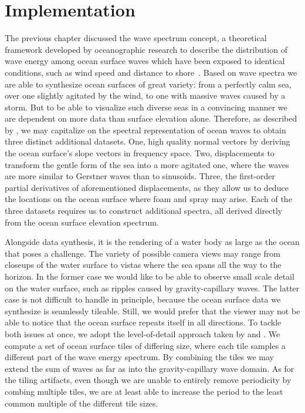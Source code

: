 \chapter{Implementation}
\label{ch:implementation}
%
The previous chapter discussed the wave spectrum concept, a theoretical
framework developed by oceanographic research to describe the distribution of
wave energy among ocean surface waves which have been exposed to identical
conditions, such as wind speed and distance to shore~\citep{Neumann:1966}.
Based on wave spectra we are able to synthesize ocean surfaces of great variety:
from a perfectly calm sea, over one slightly agitated by the wind, to one with
massive waves caused by a storm. %
But to be able to visualize such diverse seas in a convincing manner we are dependent on more data
than surface elevation alone. Therefore, as described by \citet{course:simulatingocean},
we may capitalize on the spectral representation of ocean waves to obtain
three distinct additional datasets.
One, high quality normal vectors by deriving the ocean surface's slope vectors in frequency space.
Two, displacements to transform the gentle form of the sea into a more agitated one, where the waves are more similar to Gerstner waves than to sinusoids.
Three, the first-order partial derivatives of aforementioned displacements, as they allow us to deduce the locations on the ocean surface where
foam and spray may arise.
Each of the three datasets requires us to construct additional spectra,
all derived directly from the ocean surface elevation spectrum.

Alongside data synthesis, it is the rendering of a water body as large as the ocean
that poses a challenge. The variety of possible camera views
may range from closeups of the water surface to vistas where the sea spans all
the way to the horizon.
In the former case we would like to be able to observe small scale detail on the
water surface, such as ripples caused by gravity-capillary waves.
The latter case is not difficult to handle in principle, because the ocean surface
data we synthesize is seamlessly tileable. Still, we would prefer that the viewer
may not be able to notice that the ocean surface repeats itself in all directions.
To tackle both issues at once, we adopt the level-of-detail approach taken by
\citet{misc:oceanlightingfft} and \citet{article:whitecaps}.
We compute a set of ocean surface tiles of differing size, where each tile samples a
different part of the wave energy spectrum. By combining the tiles we may
extend the sum of waves as far as into the gravity-capillary wave domain.
As for the tiling artifacts, even though we are unable to entirely remove periodicity
by combing multiple tiles, we are at least able to increase the period to the
least common multiple of the different tile sizes.

